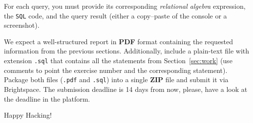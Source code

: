 \documentclass{article}
\begin{document}
For each query, you must provide its corresponding \textit{relational algebra} expression, the \texttt{SQL} code, and the query result (either a copy–paste of the console or a screenshot).

We expect a well-structured report in \textbf{PDF} format containing the requested information from the previous sections. Additionally, include a plain-text file with extension \texttt{.sql} that contains all the statements from Section~\ref{sec:work} (use comments to point the exercise number and the corresponding statement). Package both files (\texttt{.pdf} and \texttt{.sql}) into a single \textbf{ZIP} file and submit it via Brightspace\texttrademark. The submission deadline is 14 days from now, please, have a look at the deadline in the platform.


\vspace{5mm}
Happy Hacking! 
\end{document}
